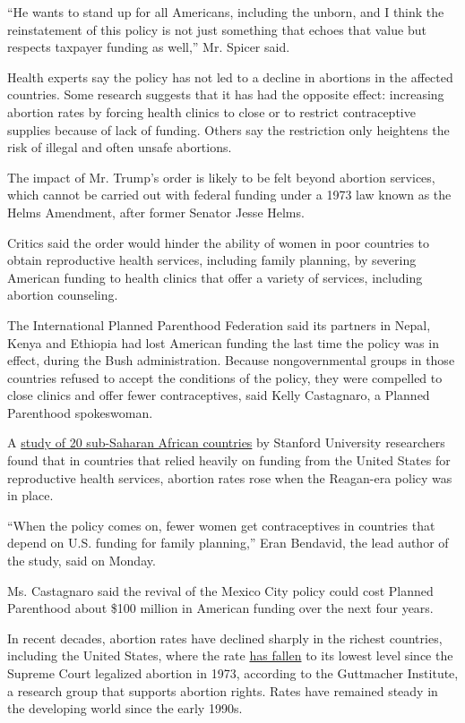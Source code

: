 ``He wants to stand up for all Americans, including the unborn, and I
think the reinstatement of this policy is not just something that echoes
that value but respects taxpayer funding as well,'' Mr. Spicer said.

Health experts say the policy has not led to a decline in abortions in
the affected countries. Some research suggests that it has had the
opposite effect: increasing abortion rates by forcing health clinics to
close or to restrict contraceptive supplies because of lack of funding.
Others say the restriction only heightens the risk of illegal and often
unsafe abortions.

The impact of Mr. Trump's order is likely to be felt beyond abortion
services, which cannot be carried out with federal funding under a 1973
law known as the Helms Amendment, after former Senator Jesse Helms.

Critics said the order would hinder the ability of women in poor
countries to obtain reproductive health services, including family
planning, by severing American funding to health clinics that offer a
variety of services, including abortion counseling.

The International Planned Parenthood Federation said its partners in
Nepal, Kenya and Ethiopia had lost American funding the last time the
policy was in effect, during the Bush administration. Because
nongovernmental groups in those countries refused to accept the
conditions of the policy, they were compelled to close clinics and offer
fewer contraceptives, said Kelly Castagnaro, a Planned Parenthood
spokeswoman.

A \href{http://www.who.int/bulletin/volumes/89/12/11-091660/en/}{study
of 20 sub-Saharan African countries} by Stanford University researchers
found that in countries that relied heavily on funding from the United
States for reproductive health services, abortion rates rose when the
Reagan-era policy was in place.

``When the policy comes on, fewer women get contraceptives in countries
that depend on U.S. funding for family planning,'' Eran Bendavid, the
lead author of the study, said on Monday.

Ms. Castagnaro said the revival of the Mexico City policy could cost
Planned Parenthood about \$100 million in American funding over the next
four years.

In recent decades, abortion rates have declined sharply in the richest
countries, including the United States, where the rate
\href{https://www.nytimes3xbfgragh.onion/2017/01/18/health/rate-of-us-abortions-hits-lowest-since-roe-v-wade.html}{has
fallen} to its lowest level since the Supreme Court legalized abortion
in 1973, according to the Guttmacher Institute, a research group that
supports abortion rights. Rates have remained steady in the developing
world since the early 1990s.

